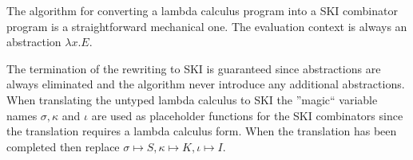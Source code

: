\documentclass[11pt,oneside,a4paper]{report}
\begin{document}
The algorithm for converting a lambda calculus program into a SKI combinator program is a straightforward mechanical one.
The evaluation context is always an abstraction $\lambda x . E$.
\begin{pcases}
\end{pcases}
The termination of the rewriting to SKI is guaranteed since abstractions are always eliminated and the algorithm never introduce any additional abstractions.
When translating the untyped lambda calculus to SKI the ''magic`` variable names $\sigma, \kappa$ and $\iota$ are used as placeholder functions for the SKI combinators since the translation requires a lambda calculus form.
When the translation has been completed then replace $\sigma \mapsto S, \kappa \mapsto K, \iota \mapsto I$.
\end{document}
